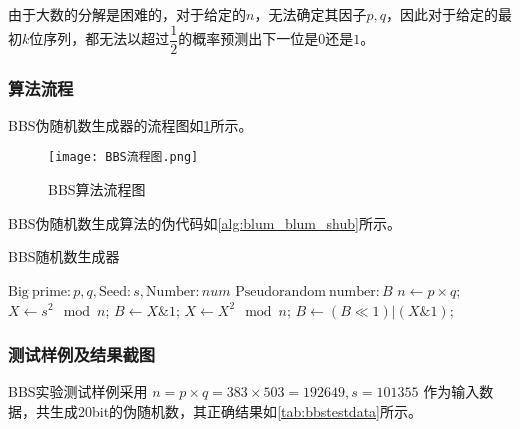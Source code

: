 \documentclass[a4paper, zihao=-4, UTF-8]{ctexart}
\newcommand{\upcite}[1]{{\textsuperscript{\cite{#1}}}}
\begin{document}
				由于大数的分解是困难的，对于给定的$n$，无法确定其因子$p, q$，因此对于给定的最初$k$位序列，都无法以超过$\dfrac{1}{2}$的概率预测出下一位是$0$还是$1$。
			\subsubsection{算法流程}
				BBS伪随机数生成器的流程图如\cref{fig:round_crypt_flow_chart}所示。
				\begin{figure}[htbp]
					\centering
					\texttt{[image: BBS流程图.png]}
					\caption{BBS算法流程图}
					\label{fig:round_crypt_flow_chart}
				\end{figure}
			
				BBS伪随机数生成算法的伪代码如\cref{alg:blum_blum_shub}所示。
				
				\begin{algorithm}[htbp]
					\caption{BBS随机数生成器}
					\label{alg:blum_blum_shub}
					\begin{algorithmic}[1]
						\Require $\mathrm{Big\ prime}: p, q, \mathrm{Seed}:s, \mathrm{Number}:num$
						\Ensure $\mathrm{Pseudorandom\ number}: B$
						\State $n \gets p \times q$;
						\State $X \gets s^2 \mod n$;
						\State $B \gets X \& 1$;
							\State $X \gets X^2\mod n$;
							\State $B \gets (B \ll 1) | (X \& 1)$;
						\EndFor
						\State {}
						\EndFunction
					\end{algorithmic}
				\end{algorithm}
			
			\subsubsection{测试样例及结果截图}
				BBS实验测试样例采用 $n=p\times q=383\times 503=192649, s = 101355$ 作为输入数据，共生成20bit的伪随机数\upcite{1}，其正确结果如\cref{tab:bbstestdata}所示。
\end{document}
